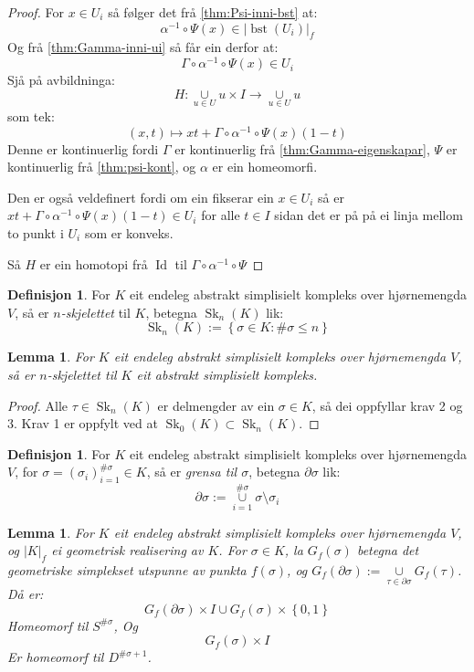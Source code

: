 \documentclass[a4paper, 12pt, norsk]{article}
\theoremstyle{plain}
\newtheorem{lemma}[theorem]{Lemma}
\theoremstyle{definition}
\newtheorem{definition}[theorem]{Definisjon}
\newcommand{\union}{ \mathop{\cup}\limits }
\newcommand{\gr}[1]{ \lvert #1 \rvert } %
\newcommand{\set}[1]{ \left \{ #1 \right \} } %
\newcommand{\tuple}[1]{ \left( #1 \right) } %
\DeclareMathOperator{\bst}{bst}
\DeclareMathOperator{\Sk}{Sk}
\DeclareMathOperator{\Id}{Id}
\begin{document}
\begin{proof}
	For \( x \in U_i \) så følger det frå \autoref{thm:Psi-inni-bst} at:
	\[
		\alpha^{-1} \circ \Psi(x) \in \gr{\bst(U_i)}_f
	\]
	Og frå \autoref{thm:Gamma-inni-ui} så får ein derfor at:
	\[
		\Gamma \circ \alpha^{-1} \circ \Psi(x) \in U_i
	\]
	Sjå på avbildninga:
	\[
		H: \union_{u \in U} u \times I \to \union_{u \in U} u
	\]
	som tek:
	\[
		\tuple{x, t} \mapsto xt + \Gamma \circ \alpha^{-1} \circ \Psi(x)(1-t)
	\]
	Denne er kontinuerlig fordi \( \Gamma \) er kontinuerlig frå \autoref{thm:Gamma-eigenskapar}, \( \Psi \) er kontinuerlig frå \autoref{thm:psi-kont}, og \( \alpha \) er ein homeomorfi.
	
	Den er også veldefinert fordi om ein fikserar ein \( x \in U_i \) så er \( xt + \Gamma \circ \alpha^{-1} \circ \Psi(x)(1-t) \in U_i \) for alle \( t \in I \) sidan det er på på ei linja mellom to punkt i \( U_i \) som er konveks.

	Så \( H \) er ein homotopi frå \( \Id \) til \( \Gamma \circ \alpha^{-1} \circ \Psi \)
\end{proof}

\begin{definition}
	For \( K \) eit endeleg abstrakt simplisielt kompleks over hjørnemengda \( V \), så er \emph{\( n \)-skjelettet} til \( K \), betegna \( \Sk_n(K) \) lik:
	\[
		\Sk_n(K) := \set{\sigma \in K : \#\sigma \leq n}
	\]
\end{definition}

\begin{lemma}
	For \( K \) eit endeleg abstrakt simplisielt kompleks over hjørnemengda \( V \), så er \( n \)-skjelettet til \( K \) eit abstrakt simplisielt kompleks.
\end{lemma}

\begin{proof}
	Alle \( \tau \in \Sk_n(K) \) er delmengder av ein \( \sigma \in K \), så dei oppfyllar krav 2 og 3. Krav 1 er oppfylt ved at \( \Sk_0(K) \subset \Sk_n(K) \).
\end{proof}

\begin{definition}
	For \( K \) eit endeleg abstrakt simplisielt kompleks over hjørnemengda \( V \), for \( \sigma = \tuple{\sigma_i}_{i=1}^{\#\sigma} \in K \), så er \emph{grensa til \( \sigma \)}, betegna \( \partial\sigma \) lik:
	\[
		\partial\sigma := \union_{i = 1}^{\#\sigma} \sigma \setminus \sigma_i 
	\]
\end{definition}

\begin{lemma} \label{thm:utvida-funk}
	For \( K \) eit endeleg abstrakt simplisielt kompleks over hjørnemengda \( V \), og \( \gr{K}_f \) ei geometrisk realisering av \( K \). For \( \sigma \in K \), la \( G_f(\sigma) \) betegna det geometriske simplekset utspunne av punkta \( f(\sigma) \), og \( G_f(\partial\sigma) := \union_{\tau \in \partial\sigma} G_f(\tau) \). Då er:
	\[
		G_f(\partial\sigma) \times I \union G_f(\sigma) \times \set{0, 1}
	\] 
	Homeomorf til \( S^{\#\sigma} \), Og
	\[
		G_f(\sigma) \times I
	\] 
	Er homeomorf til \( D^{\#\sigma+1} \).
\end{lemma}
\end{document}
